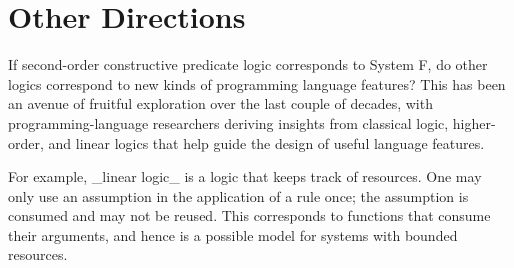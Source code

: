 \section{Other Directions}

If second-order constructive predicate logic corresponds to System F, do
other logics correspond to new kinds of programming language features?
This has been an avenue of fruitful exploration over the last couple
of decades, with programming-language researchers deriving insights
from classical logic, higher-order, and linear logics that help guide
the design of useful language features.

For example, _linear logic_ is a logic that keeps track of resources.  One may only use an assumption in the application of a rule once; the assumption is consumed and may not be reused.  This corresponds to functions that consume their arguments, and hence is a possible model for systems with bounded resources.
